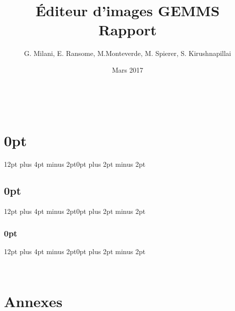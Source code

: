 \documentclass[11pt, a4paper, french, twoside]{article}
\title{Éditeur d'images GEMMS \\ Rapport}
\author{G. Milani, E. Ransome, M.Monteverde, M. Spierer, S. Kirushnapillai}
\date{Mars 2017}
\begin{document}
\graphicspath{ {img/} }

\newcommand{\HRule}{\rule{\linewidth}{0.5mm}}


\newpage~


\thispagestyle{empty}
\newpage


\tableofcontents
\newpage
\listoffigures
\newpage

\renewcommand{\arraystretch}{1.5}

\setlength{\parskip}{1em}
\setlength{\parindent}{0pt}

\titlespacing\section{0pt}{12pt plus 4pt minus 2pt}{0pt plus 2pt minus 2pt}
\titlespacing\subsection{0pt}{12pt plus 4pt minus 2pt}{0pt plus 2pt minus 2pt}
\titlespacing\subsubsection{0pt}{12pt plus 4pt minus 2pt}{0pt plus 2pt minus 2pt}


~
\thispagestyle{empty}
\setcounter{page}{0}
\newpage












\newpage
\glsaddall
\printglossary[toctitle=Glossaire]

\newpage

\nocite{*}




\section{Annexes}
\appendix

\end{document}
